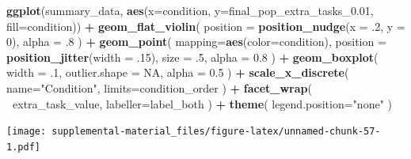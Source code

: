 \documentclass[]{book}
\newenvironment{Shaded}{\begin{snugshade}}{\end{snugshade}}
\newcommand{\DataTypeTok}[1]{\textcolor[rgb]{0.13,0.29,0.53}{#1}}
\newcommand{\DecValTok}[1]{\textcolor[rgb]{0.00,0.00,0.81}{#1}}
\newcommand{\FloatTok}[1]{\textcolor[rgb]{0.00,0.00,0.81}{#1}}
\newcommand{\KeywordTok}[1]{\textcolor[rgb]{0.13,0.29,0.53}{\textbf{#1}}}
\newcommand{\NormalTok}[1]{#1}
\newcommand{\OperatorTok}[1]{\textcolor[rgb]{0.81,0.36,0.00}{\textbf{#1}}}
\newcommand{\OtherTok}[1]{\textcolor[rgb]{0.56,0.35,0.01}{#1}}
\newcommand{\StringTok}[1]{\textcolor[rgb]{0.31,0.60,0.02}{#1}}
\begin{document}
\begin{Shaded}
\begin{Highlighting}[]
\KeywordTok{ggplot}\NormalTok{(summary_data, }\KeywordTok{aes}\NormalTok{(}\DataTypeTok{x=}\NormalTok{condition, }\DataTypeTok{y=}\NormalTok{final_pop_extra_tasks_}\FloatTok{0.01}\NormalTok{, }\DataTypeTok{fill=}\NormalTok{condition)) }\OperatorTok{+}
\StringTok{  }\KeywordTok{geom_flat_violin}\NormalTok{(}
    \DataTypeTok{position =} \KeywordTok{position_nudge}\NormalTok{(}\DataTypeTok{x =} \FloatTok{.2}\NormalTok{, }\DataTypeTok{y =} \DecValTok{0}\NormalTok{),}
    \DataTypeTok{alpha =} \FloatTok{.8}
\NormalTok{  ) }\OperatorTok{+}
\StringTok{  }\KeywordTok{geom_point}\NormalTok{(}
    \DataTypeTok{mapping=}\KeywordTok{aes}\NormalTok{(}\DataTypeTok{color=}\NormalTok{condition),}
    \DataTypeTok{position =} \KeywordTok{position_jitter}\NormalTok{(}\DataTypeTok{width =} \FloatTok{.15}\NormalTok{),}
    \DataTypeTok{size =} \FloatTok{.5}\NormalTok{,}
    \DataTypeTok{alpha =} \FloatTok{0.8}
\NormalTok{  ) }\OperatorTok{+}
\StringTok{  }\KeywordTok{geom_boxplot}\NormalTok{(}
    \DataTypeTok{width =} \FloatTok{.1}\NormalTok{,}
    \DataTypeTok{outlier.shape =} \OtherTok{NA}\NormalTok{,}
    \DataTypeTok{alpha =} \FloatTok{0.5}
\NormalTok{  ) }\OperatorTok{+}
\StringTok{  }\KeywordTok{scale_x_discrete}\NormalTok{(}
    \DataTypeTok{name=}\StringTok{"Condition"}\NormalTok{,}
    \DataTypeTok{limits=}\NormalTok{condition_order}
\NormalTok{  ) }\OperatorTok{+}
\StringTok{  }\KeywordTok{facet_wrap}\NormalTok{(}
    \OperatorTok{~}\NormalTok{extra_task_value,}
    \DataTypeTok{labeller=}\NormalTok{label_both}
\NormalTok{  ) }\OperatorTok{+}
\StringTok{  }\KeywordTok{theme}\NormalTok{(}
    \DataTypeTok{legend.position=}\StringTok{"none"}
\NormalTok{  )}
\end{Highlighting}
\end{Shaded}

\texttt{[image: supplemental-material\_files/figure-latex/unnamed-chunk-57-1.pdf]}

\begin{Shaded}
\end{Shaded}
\end{document}
